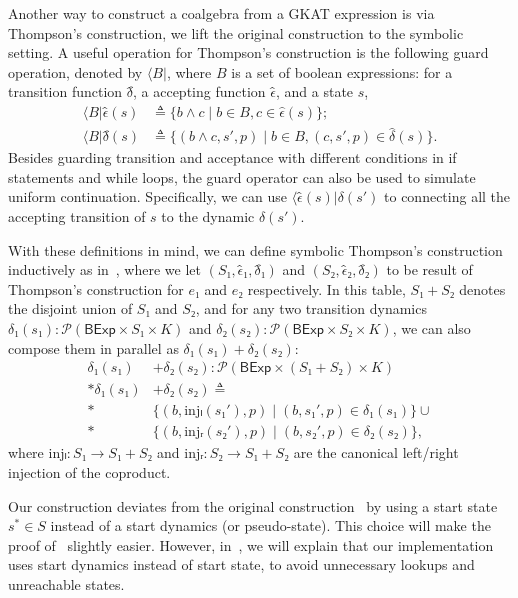 \documentclass[conference]{IEEEtran}
\newcommand{\theoryOf}[1]{\ensuremath{\mathsf{#1}}}
\newcommand{\BExp}{\theoryOf{BExp}}
\begin{document}
Another way to construct a coalgebra from a GKAT expression is via Thompson's construction, we lift the original construction to the symbolic setting.
A useful operation for Thompson's construction is the following guard operation, denoted by \(⟨B|\), where \(B\) is a set of boolean expressions: for a transition function \(δ̂\), a accepting function \(ϵ̂\), and a state \(s\),
\begin{align*}
    ⟨B|ϵ̂(s) & ≜ \{b ∧ c ∣ b ∈ B, c ∈ \hat{\epsilon}(s)\}; \\
    ⟨B|δ̂(s) & ≜ \{(b ∧ c, s', p) ∣ b ∈ B, (c, s', p) ∈ \hat{\delta}(s)\}.
\end{align*}
Besides guarding transition and acceptance with different conditions in if statements and while loops, the guard operator can also be used to simulate uniform continuation. Specifically, we can use \(⟨ϵ̂(s)|δ(s')\) to connecting all the accepting transition of \(s\) to the dynamic \(δ(s')\).

With these definitions in mind, we can define symbolic Thompson's construction inductively as in~, where we let \((S₁, ϵ̂₁, δ̂₁)\) and \((S₂, ϵ̂₂, δ̂₂)\) to be result of Thompson's construction for \(e₁\) and \(e₂\) respectively.
In this table, \(S₁ + S₂\) denotes the disjoint union of \(S₁\) and \(S₂\), and for any two transition dynamics \(δ₁(s₁): 𝒫(\BExp × S₁ × K)\) and \(δ₂(s₂): 𝒫(\BExp × S₂ × K)\), we can also compose them in parallel as \(δ₁(s₁) + δ₂(s₂)\):
\begin{align*}
    δ₁(s₁) & + δ₂(s₂): 𝒫(\BExp × (S₁ + S₂) × K) \\*
    δ₁(s₁) & + δ₂(s₂) ≜ \\*
        & \{(b, \mathrm{inj}ₗ(s₁'), p) ∣ (b, s₁', p) ∈ δ₁(s₁)\} ∪ \\*
        & \{(b, \mathrm{inj}ᵣ(s₂'), p) ∣ (b, s₂', p) ∈ δ₂(s₂)\},
\end{align*}
where \(\mathrm{inj}ₗ: S₁ → S₁ + S₂\) and \(\mathrm{inj}ᵣ: S₂ → S₁ + S₂\) are the canonical left/right injection of the coproduct.

Our construction deviates from the original construction~\cite{smolka_GuardedKleeneAlgebra_2020} by using a start state \(s^* ∈ S\) instead of a start dynamics (or pseudo-state).
This choice will make the proof of~ slightly easier. 
However, in~, we will explain that our implementation uses start dynamics instead of start state, to avoid unnecessary lookups and unreachable states.
\end{document}
